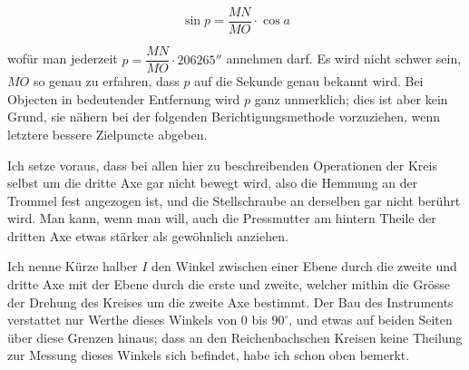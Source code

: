 \[ \sin p = \frac{MN}{MO}\cdot\cos a \]

\noindent wofür man jederzeit $p = \dfrac{MN}{MO}\cdot 206265''$ annehmen darf. Es wird nicht schwer sein, $MO$ so genau zu erfahren, dass $p$ auf die Sekunde genau bekannt wird. Bei Objecten in bedeutender Entfernung wird $p$ ganz unmerklich; dies ist aber kein Grund, sie nähern bei der folgenden Berichtigungsmethode vorzuziehen, wenn letztere bessere Zielpuncte abgeben.

\par\indent Ich setze voraus, dass bei allen hier zu beschreibenden Operationen der Kreis selbst um die dritte Axe gar nicht bewegt wird, also die Hemmung an der Trommel fest angezogen ist, und die Stellschraube an derselben gar nicht berührt wird. Man kann, wenn man will, auch die Pressmutter am hintern Theile der dritten Axe etwas stärker als gewöhnlich anziehen.

\par\indent Ich nenne Kürze halber $I$ den Winkel zwischen einer Ebene durch die zweite und dritte Axe mit der Ebene durch die erste und zweite, welcher mithin die Grösse der Drehung des Kreises um die zweite Axe bestimmt. Der Bau des Instruments verstattet nur Werthe dieses Winkels von $0$ bis $90^\circ$, und etwas auf beiden Seiten über diese Grenzen hinaus; dass an den Reichenbachschen Kreisen keine Theilung zur Messung dieses Winkels sich befindet, habe ich schon oben bemerkt.

